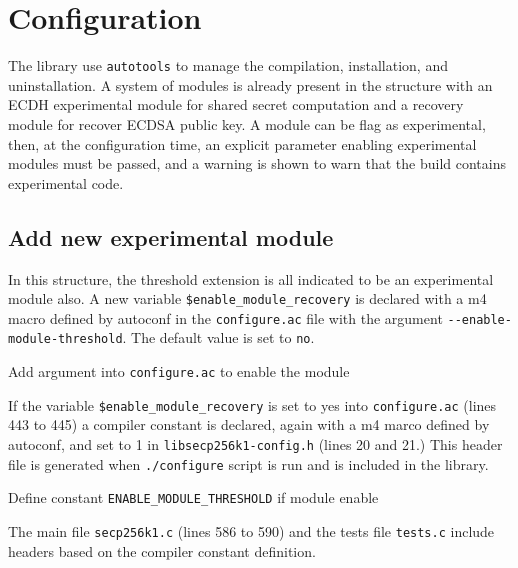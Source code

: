 \section{Configuration}

The library use \texttt{autotools} to manage the compilation, installation, and
uninstallation. A system of modules is already present in the structure with an
ECDH experimental module for shared secret computation and a recovery module for
recover ECDSA public key. A module can be flag as experimental, then, at the
configuration time, an explicit parameter enabling experimental modules must be
passed, and a warning is shown to warn that the build contains experimental
code.

\subsection{Add new experimental module}

In this structure, the threshold extension is all indicated to be an
experimental module also. A new variable \texttt{\$enable\_module\_recovery} is
declared with a m4 macro defined by autoconf in the \texttt{configure.ac} file
with the argument \texttt{-{}-enable-module-threshold}. The default value is set
to \texttt{no}.

\begin{listing}
	\caption{Add argument into \texttt{configure.ac} to enable the module}
	\label{lst:configureEnableThreshold}
\end{listing}

If the variable \texttt{\$enable\_module\_recovery} is set to yes into
\texttt{configure.ac} (lines 443 to 445) a compiler constant is declared, again
with a m4 marco defined by autoconf, and set to 1 in
\texttt{libsecp256k1-config.h} (lines 20 and 21.) This header file is generated
when \texttt{./configure} script is run and is included in the library.

\begin{listing}
	\caption{Define constant \texttt{ENABLE\_MODULE\_THRESHOLD} if module enable}
	\label{lst:defineEnableThreshold}
\end{listing}

The main file \texttt{secp256k1.c} (lines 586 to 590) and the tests file
\texttt{tests.c} include headers based on the compiler constant definition.

